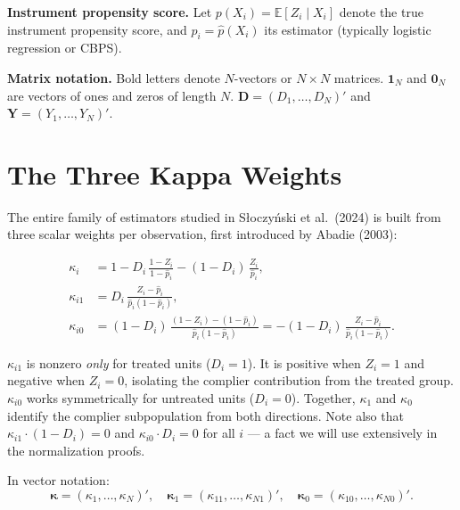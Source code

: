 \documentclass[12pt, a4paper]{article}
\theoremstyle{condstyle}
\theoremstyle{plain}
\newcommand{\bone}{\mathbf{1}_N}
\newcommand{\bzero}{\mathbf{0}_N}
\newcommand{\phat}{\hat{p}}
\begin{document}
\medskip
\noindent\textbf{Instrument propensity score.}
Let $p(X_i) = \mathbb{E}[Z_i \mid X_i]$ denote the true instrument propensity score,
and $\phat_i = \hat{p}(X_i)$ its estimator (typically logistic regression or CBPS).

\medskip
\noindent\textbf{Matrix notation.}
Bold letters denote $N$-vectors or $N\times N$ matrices.
$\bone$ and $\bzero$ are vectors of ones and zeros of length $N$.
$\mathbf{D} = (D_1,\ldots,D_N)'$ and $\mathbf{Y} = (Y_1,\ldots,Y_N)'$.

\section{The Three Kappa Weights}
\label{sec:kappa}

The entire family of estimators studied in S\l oczy\'nski et al.\ (2024) is built from three scalar weights
per observation, first introduced by Abadie (2003):

\begin{align}
  \kappa_i   &= 1 - D_i\,\frac{1-Z_i}{1-\phat_i} - (1-D_i)\,\frac{Z_i}{\phat_i},
  \label{eq:kappa}\\[6pt]
  \kappa_{i1} &= D_i\,\frac{Z_i - \phat_i}{\phat_i(1-\phat_i)},
  \label{eq:kappa1}\\[6pt]
  \kappa_{i0} &= (1-D_i)\,\frac{(1-Z_i)-(1-\phat_i)}{\phat_i(1-\phat_i)}
               = -(1-D_i)\,\frac{Z_i - \phat_i}{\phat_i(1-\phat_i)}.
  \label{eq:kappa0}
\end{align}

\begin{notebox}[Intuition]
$\kappa_{i1}$ is nonzero \emph{only} for treated units ($D_i=1$).
It is positive when $Z_i=1$ and negative when $Z_i=0$,
isolating the complier contribution from the treated group.
$\kappa_{i0}$ works symmetrically for untreated units ($D_i=0$).
Together, $\kappa_1$ and $\kappa_0$ identify the complier subpopulation from both directions.
Note also that $\kappa_{i1} \cdot (1-D_i) = 0$ and $\kappa_{i0} \cdot D_i = 0$ for all $i$
--- a fact we will use extensively in the normalization proofs.
\end{notebox}

In vector notation:
\[
  \boldsymbol{\kappa} = (\kappa_1,\ldots,\kappa_N)',\quad
  \boldsymbol{\kappa}_1 = (\kappa_{11},\ldots,\kappa_{N1})',\quad
  \boldsymbol{\kappa}_0 = (\kappa_{10},\ldots,\kappa_{N0})'.
\]
\end{document}
